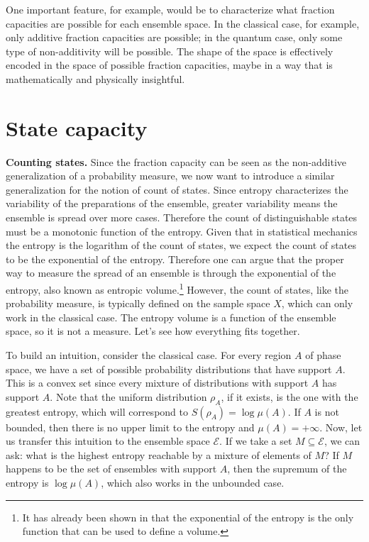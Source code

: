 \documentclass[10pt,twocolumn, nofootinbib]{revtex4-2}
\newcommand{\Ens}[1][E] {\mathcal{#1}} %
\begin{document}
One important feature, for example, would be to characterize what fraction capacities are possible for each ensemble space. In the classical case, for example, only additive fraction capacities are possible; in the quantum case, only some type of non-additivity will be possible. The shape of the space is effectively encoded in the space of possible fraction capacities, maybe in a way that is mathematically and physically insightful.

\section{State capacity}

\textbf{Counting states.} Since the fraction capacity can be seen as the non-additive generalization of a probability measure, we now want to introduce a similar generalization for the notion of count of states. Since entropy characterizes the variability of the preparations of the ensemble, greater variability means the ensemble is spread over more cases. Therefore the count of distinguishable states must be a monotonic function of the entropy. Given that in statistical mechanics the entropy is the logarithm of the count of states, we expect the count of states to be the exponential of the entropy. Therefore one can argue that the proper way to measure the spread of an ensemble is through the exponential of the entropy, also known as entropic volume.\footnote{It has already been shown in \cite{hall1999} that the exponential of the entropy is the only function that can be used to define a volume.} However, the count of states, like the probability measure, is typically defined on the sample space $X$, which can only work in the classical case. The entropy volume is a function of the ensemble space, so it is not a measure. Let's see how everything fits together.

To build an intuition, consider the classical case. For every region $A$ of phase space, we have a set of possible probability distributions that have support $A$. This is a convex set since every mixture of distributions with support $A$ has support $A$. Note that the uniform distribution $\rho_A$, if it exists, is the one with the greatest entropy, which will correspond to $S(\rho_A) = \log \mu(A)$. If $A$ is not bounded, then there is no upper limit to the entropy and $\mu(A) = +\infty$. Now, let us transfer this intuition to the ensemble space $\Ens$. If we take a set $M\subseteq \Ens$, we can ask: what is the highest entropy reachable by a mixture of elements of $M$? If $M$ happens to be the set of ensembles with support $A$, then the supremum of the entropy is $\log \mu(A)$, which also works in the unbounded case.
\end{document}
